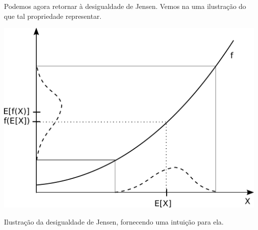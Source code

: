 Podemos agora retornar à desigualdade de Jensen. Vemos na  uma ilustração
do que tal propriedade representar.
\begin{marginfigure}%
  \includegraphics[width=\linewidth]{figures/jensen.pdf}
  \caption{Ilustração da desigualdade de Jensen, fornecendo uma intuição para ela.}
  \label{fig:jensen}
\end{marginfigure}


